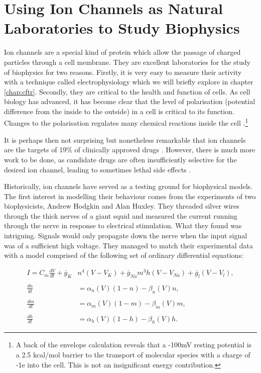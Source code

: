 \section{Using Ion Channels as Natural Laboratories to Study Biophysics}
\label{ion_channel_laboratories}

Ion channels are a special kind of protein which allow the passage of charged particles through a cell membrane. They are excellent laboratories for the study of biophysics for two reasons. Firstly, it is very easy to measure their activity with a technique called electrophysiology which we will briefly explore in chapter \ref{chap:cftr}\cite{hille2001}. Secondly, they are critical to the health and function of cells. As cell biology has advanced, it has become clear that the level of polarisation (potential difference from the inside to the outside) in a cell is critical to its function. Changes to the polarisation regulates many chemical reactions inside the cell \cite{catterall2011, muthuswamy2012, levin2014, levin2014a}.\footnote{A back of the envelope calculation reveals that a -100mV resting potential is a 2.5 kcal/mol barrier to the transport of molecular species with a charge of -1e into the cell. This is not an insignificant energy contribution.} 

It is perhaps then not surprising but nonetheless remarkable that ion channels are the targets of 19\% of clinically approved drugs \cite{santos2017}. However, there is much more work to be done, as candidate drugs are often insufficiently selective for the desired ion channel, leading to sometimes lethal side effects \cite{stansfeld2006, kaczorowski2008, waszkielewicz2013}.

Historically, ion channels have served as a testing ground for biophysical models. The first interest in modelling their behaviour comes from the experiments of two biophysicists, Andrew Hodgkin and Alan Huxley. They threaded silver wires through the thick nerves of a giant squid and measured the current running through the nerve in response to electrical stimulation. What they found was intriguing. Signals would only propagate down the nerve when the input signal was of a sufficient high voltage. They managed to match their experimental data with a model comprised of the following set of ordinary differential equations:

\begin{equation}
	\label{hh_equations}
\begin{aligned}
	I = C_m \frac{dV}{dt} + \bar{g}_K& n^4 (V - V_K) + \bar{g}_{Na} m^3 h (V - V_{Na} ) + \bar{g}_l (V-V_l) , \\ \\
	\frac{dn}{dt} &= \alpha_n(V)  (1-n) - \beta_n(V)  n, \\ \\
	\frac{dm}{dt} &= \alpha_m(V)  (1-m) - \beta_m(V)  m, \\ \\
	\frac{dh}{dt} &= \alpha_h(V)  (1-h) - \beta_h(V)  h.  
\end{aligned}
\end{equation}

